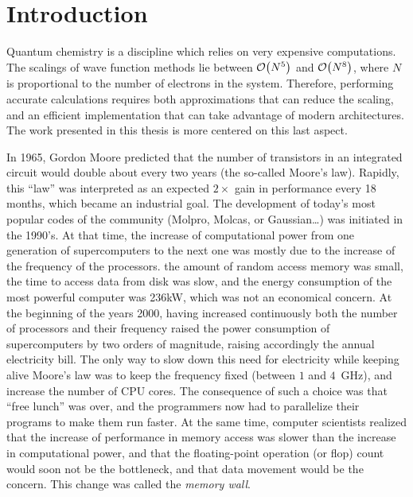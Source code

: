 \documentclass[12pt,a4paper]{report}
\begin{document}



\chapter{Introduction}


Quantum chemistry is a discipline which relies on very expensive computations.
The scalings of wave function methods lie between $\order{N^5}$ and
$\order{N^8}$, where $N$ is proportional to the number of electrons in the
system. Therefore, performing accurate calculations requires both
approximations that can reduce the scaling, and an efficient implementation
that can take advantage of modern architectures. The work presented in this
thesis is more centered on this last aspect. 

In 1965, Gordon Moore predicted that the number of transistors in an integrated
circuit would double about every two years (the so-called Moore's
law).\cite{Moore}  Rapidly, this ``law'' was interpreted as an expected
$2\times$ gain in performance every 18 months, which became an industrial goal.
The development of today's most popular codes of the community
(Molpro\cite{Molpro}, Molcas\cite{Molcas}, or Gaussian\cite{g09}\dots) was
initiated in the 1990's.  At that time, the increase of computational power
from one generation of supercomputers to the next one was mostly due to the
increase of the frequency of the processors. the amount of random access memory
was small, the time to access data from disk was slow, and the energy
consumption of the most powerful computer was 236kW, which was not an
economical concern.\cite{top500_93}
At the beginning of the years 2000, having increased continuously both the number
of processors and their frequency raised the power consumption of
supercomputers by two orders of magnitude, raising accordingly the annual
electricity bill.  The only way to slow down this need for electricity while
keeping alive Moore's law was to keep the frequency fixed (between $1$ and
$4$~GHz), and increase the number of CPU cores.  The consequence of such a
choice was that ``free lunch'' was over, and the programmers now had to parallelize
their programs to make them run faster.\cite{Sutter_2005}
At the same time, computer scientists
realized that the increase of performance in memory access was slower than the
increase in computational power,\cite{Wulf1995Mar} and that the floating-point
operation (or flop) count would soon not be the bottleneck, and that data
movement would be the concern. This change was called the \emph{memory wall}.
\end{document}
